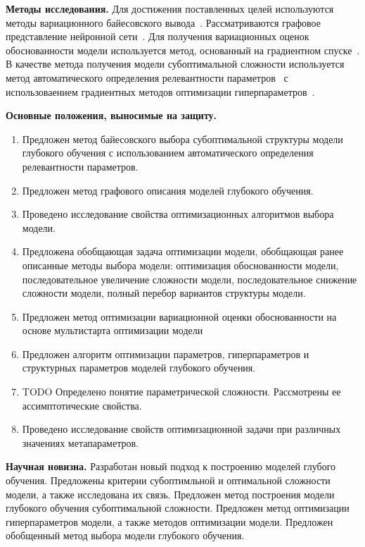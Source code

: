 \vspace{0.5cm}
\textbf{Методы исследования.} Для достижения поставленных целей используются методы вариационного байесовского вывода~\cite{mackay, bishop, early}. Рассматриваются графовое представление нейронной сети~\cite{reinf,darts}. Для получения вариационных оценок обоснованности модели используется метод, основанный на градиентном спуске~\cite{sgd_cont, early}. В качестве метода получения модели субоптимальной сложности используется метод автоматического определения релевантности параметров~\cite{mackay,vae_ard} с использоваением градиентных методов оптимизации гиперпараметров~\cite{hyper, hyper2, greed_hyper, approx_hyper}.

\vspace{0.5cm}
\textbf{Основные положения, выносимые на защиту.}
\vspace{0.3cm}
\begin{enumerate}
\item Предложен метод байесовского выбора субоптимальной структуры модели
глубокого обучения с использованием автоматического определения
релевантности параметров.
\item Предложен метод графового описания моделей глубокого обучения.
\item Проведено исследование свойства оптимизационных алгоритмов выбора модели.
\item Предложена обобщающая задача оптимизации модели, обобщающая ранее
описанные методы выбора модели:
оптимизация обоснованности модели,
последовательное увеличение сложности модели,
последовательное снижение сложности модели,
полный перебор вариантов структуры модели.
\item Предложен метод оптимизации вариационной оценки обоснованности на основе мультистарта оптимизации модели
\item Предложен алгоритм оптимизации параметров, гиперпараметров и структурных параметров моделей глубокого обучения.
\item TODO Определено понятие параметрической сложности. Рассмотрены ее ассимптотические свойства.
\item Проведено исследование свойств оптимизационной задачи при различных значениях метапараметров.
\end{enumerate}


\vspace{0.5cm}
\textbf{Научная новизна.} Разработан новый подход к построению моделей глубого обучения. Предложены критерии субоптимльной и оптимальной сложности модели, а также исследована их связь. Предложен метод построения модели глубокого обучения субоптимальной сложности. Предложен метод оптимизации гиперпараметров модели, а также методов оптимизации модели.  Предложен обобщенный метод выбора модели глубокого обучения.

